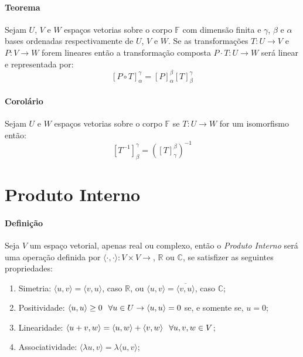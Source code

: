 \documentclass{article}
\begin{document}
            \paragraph{Teorema}Sejam $U$, $V$ e $W$ espaços vetorias sobre o corpo $\mathbb{F}$ com dimensão finita e $\gamma$, $\beta$ e $\alpha$ bases ordenadas respectivamente de $U$, $V$ e $W$. Se as transformações $T: U \rightarrow V$ e $P: V \rightarrow W$ forem lineares então a transformação composta $P \cdot T: U \rightarrow W$ será linear e representada por:
                \[\boxed{[P\circ T]_{\alpha}^{\gamma} = [P]_{\alpha}^{\beta}[T]_{\beta}^{\gamma}}\]

            \paragraph{Corolário}Sejam $U$ e $W$ espaços vetorias sobre o corpo $\mathbb{F}$ se $T: U\rightarrow W$ for um isomorfismo então:
                \[\boxed{[T^{-1}]_{\beta}^{\gamma} = \left([T]_{\gamma}^{\beta}\right)^{-1}}\]
\newpage

    \section{Produto Interno}
        \paragraph{Definição}Seja $V$ um espaço vetorial, apenas real ou complexo, então o \textit{Produto Interno} será uma operação definida por $\langle\cdot,\cdot\rangle: V\times V \rightarrow$, $\mathbb{R}$ ou $\mathbb{C}$, se satisfizer as seguintes propriedades:
            \begin{enumerate}[noitemsep]
                \item Simetria: $\langle u, v \rangle = \langle v, u \rangle$, caso $\mathbb{R}$, ou $\langle u, v \rangle = \overline{\langle v, u \rangle}$, caso $\mathbb{C}$;
                \item Positividade: $\langle u, u \rangle \geq 0 \hspace{2.5mm} \forall u \in U \rightarrow \langle u, u \rangle = 0$ se, e somente se, $u=0$;
                \item Linearidade: $\langle u+v, w \rangle = \langle u, w \rangle + \langle v, w \rangle \hspace{2.5mm} \forall u, v, w \in V$;
                \item Associatividade: $\langle \lambda u, v \rangle = \lambda\langle u, v \rangle$;
            \end{enumerate}
\end{document}
